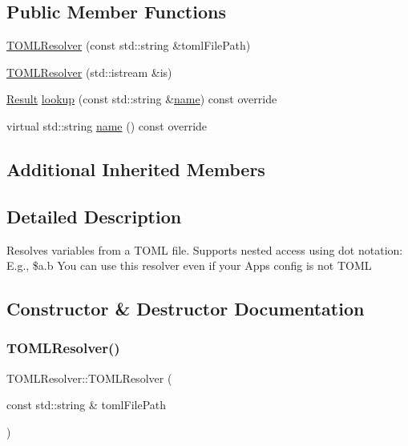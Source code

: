 \subsection*{Public Member Functions}
\begin{DoxyCompactItemize}
\item 
\hyperlink{classtheoria_1_1config_1_1TOMLResolver_a94a2659c23a5c85d05fb62e67c8c7810}{T\+O\+M\+L\+Resolver} (const std\+::string \&toml\+File\+Path)
\item 
\hyperlink{classtheoria_1_1config_1_1TOMLResolver_a2772b7d149cabddd2b622b786720420f}{T\+O\+M\+L\+Resolver} (std\+::istream \&is)
\item 
\hyperlink{classtheoria_1_1config_1_1ConfigVariableResolver_af27a85262d802c9ad4ecb1179efaf447}{Result} \hyperlink{classtheoria_1_1config_1_1TOMLResolver_a42daff166eca2c9c9dd77868faf0122d}{lookup} (const std\+::string \&\hyperlink{classtheoria_1_1config_1_1TOMLResolver_a6b50ff1e396f74183318915e602837fc}{name}) const override
\item 
virtual std\+::string \hyperlink{classtheoria_1_1config_1_1TOMLResolver_a6b50ff1e396f74183318915e602837fc}{name} () const override
\end{DoxyCompactItemize}
\subsection*{Additional Inherited Members}


\subsection{Detailed Description}
Resolves variables from a T\+O\+ML file. Supports nested access using dot notation\+: E.\+g., \$a.\+b You can use this resolver even if your App\textquotesingle{}s config is not T\+O\+ML 

\subsection{Constructor \& Destructor Documentation}
\mbox{\label{classtheoria_1_1config_1_1TOMLResolver_a94a2659c23a5c85d05fb62e67c8c7810}} 
\subsubsection{\texorpdfstring{T\+O\+M\+L\+Resolver()}{TOMLResolver()}\hspace{0.1cm}{\footnotesize\ttfamily [1/2]}}
{\footnotesize\ttfamily T\+O\+M\+L\+Resolver\+::\+T\+O\+M\+L\+Resolver (\begin{DoxyParamCaption}\item[{const std\+::string \&}]{toml\+File\+Path }\end{DoxyParamCaption})}

